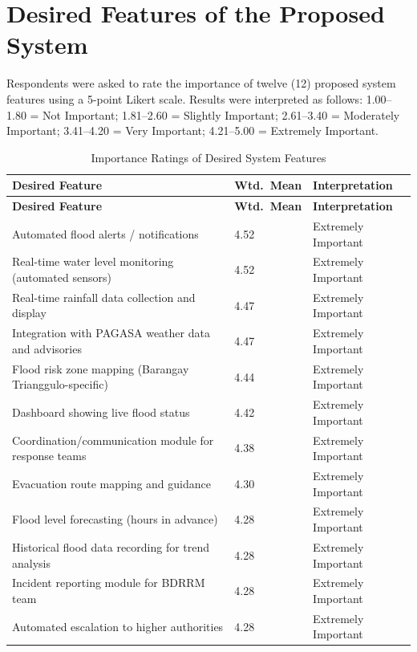 \documentclass{research}
\begin{document}
\section{Desired Features of the Proposed System}
 
Respondents were asked to rate the importance of twelve (12) proposed system
features using a 5-point Likert scale. Results were interpreted as follows: 1.00--1.80 =
Not Important; 1.81--2.60 = Slightly Important; 2.61--3.40 = Moderately Important;
3.41--4.20 = Very Important; 4.21--5.00 = Extremely Important.
 
\begin{longtable}{p{9.8cm}|p{1.4cm}|p{3cm}}
\caption{Importance Ratings of Desired System Features}
\label{tab:features} \\
\hline
\textbf{Desired Feature} & \textbf{Wtd.\ Mean} & \textbf{Interpretation} \\
\hline
\endfirsthead
\hline
\textbf{Desired Feature} & \textbf{Wtd.\ Mean} & \textbf{Interpretation} \\
\hline
\endhead
\hline
\endfoot
Automated flood alerts / notifications
  & 4.52 & Extremely Important \\[3pt]
Real-time water level monitoring (automated sensors)
  & 4.52 & Extremely Important \\[3pt]
Real-time rainfall data collection and display
  & 4.47 & Extremely Important \\[3pt]
Integration with PAGASA weather data and advisories
  & 4.47 & Extremely Important \\[3pt]
Flood risk zone mapping (Barangay Trianggulo-specific)
  & 4.44 & Extremely Important \\[3pt]
Dashboard showing live flood status
  & 4.42 & Extremely Important \\[3pt]
Coordination/communication module for response teams
  & 4.38 & Extremely Important \\[3pt]
Evacuation route mapping and guidance
  & 4.30 & Extremely Important \\[3pt]
Flood level forecasting (hours in advance)
  & 4.28 & Extremely Important \\[3pt]
Historical flood data recording for trend analysis
  & 4.28 & Extremely Important \\[3pt]
Incident reporting module for BDRRM team
  & 4.28 & Extremely Important \\[3pt]
Automated escalation to higher authorities
  & 4.28 & Extremely Important \\
\hline
\end{longtable}
\end{document}
